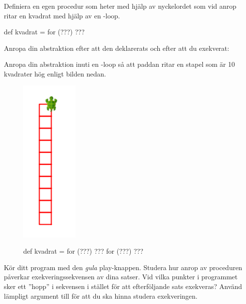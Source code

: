 
\Subtask Definiera en egen procedur som heter  med hjälp av nyckelordet  som vid anrop ritar en kvadrat med hjälp av en -loop.

\begin{Code}
def kvadrat = for (???) {???}
\end{Code}


\Subtask Anropa din abstraktion efter att den deklarerats och efter att du exekverat:\\


\Subtask Anropa din abstraktion inuti en -loop så att paddan ritar en stapel som är 10 kvadrater hög enligt bilden nedan.

\begin{figure}
  \begin{multicols}{2}

  \includegraphics[scale=0.6]{../img/kojo/square-column}

  \columnbreak

  \begin{Code}
  def kvadrat = for (???) {???}
  for (???) {???}
  \end{Code}

  \end{multicols}
\end{figure}

\Subtask Kör ditt program med den \emph{gula} play-knappen. Studera hur anrop av proceduren  påverkar exekveringssekvensen av dina satser. Vid vilka punkter i programmet sker ett ''hopp'' i sekvensen i stället för att efterföljande sats exekveras? Använd lämpligt argument till  för att du ska hinna studera exekveringen.


